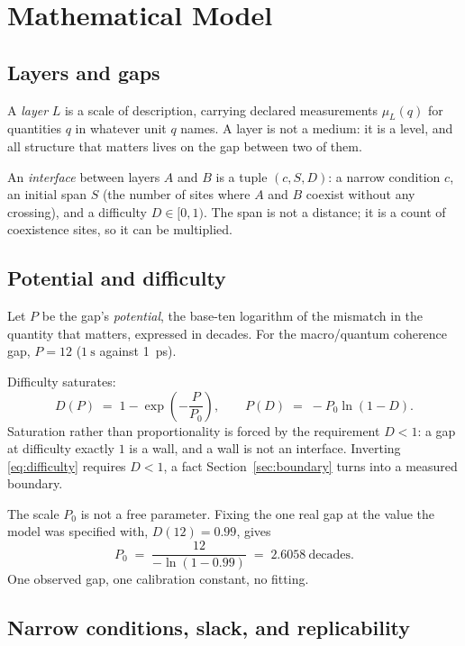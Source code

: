 \documentclass[conference]{IEEEtran}
\theoremstyle{definition}
\begin{document}
\section{Mathematical Model}
\label{sec:model}

\subsection{Layers and gaps}

A \emph{layer} $L$ is a scale of description, carrying declared measurements
$\mu_L(q)$ for quantities $q$ in whatever unit $q$ names. A layer is not a medium:
it is a level, and all structure that matters lives on the gap between two of them.

An \emph{interface} between layers $A$ and $B$ is a tuple
$(c, S, D)$: a narrow condition $c$, an initial span $S$ (the number of sites where
$A$ and $B$ coexist without any crossing), and a difficulty $D\in[0,1)$. The span
is not a distance; it is a count of coexistence sites, so it can be multiplied.

\subsection{Potential and difficulty}

Let $P$ be the gap's \emph{potential}, the base-ten logarithm of the mismatch in
the quantity that matters, expressed in decades. For the macro/quantum coherence
gap, $P=12$ ($\SI{1}{\second}$ against \SI{1}{\pico\second}).

Difficulty saturates:
\begin{equation}
D(P) \;=\; 1-\exp\!\left(-\frac{P}{P_0}\right), \qquad
P(D) \;=\;-P_0\ln(1-D).
\label{eq:difficulty}
\end{equation}
Saturation rather than proportionality is forced by the requirement $D<1$: a gap
at difficulty exactly $1$ is a wall, and a wall is not an interface. Inverting
\eqref{eq:difficulty} requires $D<1$, a fact Section~\ref{sec:boundary} turns into
a measured boundary.

The scale $P_0$ is not a free parameter. Fixing the one real gap at the value the
model was specified with, $D(12)=0.99$, gives
\begin{equation}
P_0 \;=\; \frac{12}{-\ln(1-0.99)} \;=\; 2.6058\ \text{decades}.
\label{eq:p0}
\end{equation}
One observed gap, one calibration constant, no fitting.

\subsection{Narrow conditions, slack, and replicability}
\end{document}
